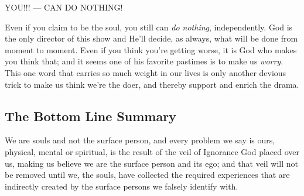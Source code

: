 \documentclass[12pt,a4paper]{book}
\begin{document}
\noindent YOU!!! --- CAN DO NOTHING!

\noindent Even if you claim to be the soul, you still can \emph{do
  nothing}, independently. God is the only director of this show and
He'll decide, as always, what will be done from moment to moment. Even
if you think you're getting worse, it is God who makes you think that;
and it seems one of his favorite pastimes is to make us \emph{worry}. This
one word that carries so much weight in our lives is only another
devious trick to make us think we're the doer, and thereby support and
enrich the drama.

\newpage
\begin{center}\section*{The Bottom Line Summary}\end{center}

We are souls and not the surface person, and every problem we say is
ours, physical, mental or spiritual, is the result of the veil of
Ignorance God placed over us, making us believe we are the surface
person and its ego; and that veil will not be removed until we, the
souls, have collected the required experiences that are indirectly
created by the surface persons we falsely identify with.




\end{document}
